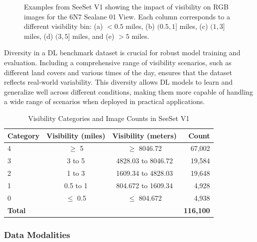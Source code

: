 \begin{figure}
    \caption{Examples from SeeSet V1 showing the impact of visibility on RGB images for the 6N7 Sealane 01 View. Each column corresponds to a different visibility bin: (a) $< 0.5$ miles, (b) $(0.5, 1]$ miles, (c) $(1, 3]$ miles, (d) $(3, 5]$ miles, and (e) $> 5$ miles.}
    \label{fig:impact_vis_deg_features}
\end{figure}

Diversity in a DL benchmark dataset is crucial for robust model training and evaluation. Including a comprehensive range of visibility scenarios, such as different land covers and various times of the day, ensures that the dataset reflects real-world variability. This diversity allows DL models to learn and generalize well across different conditions, making them more capable of handling a wide range of scenarios when deployed in practical applications.

\begin{table}[htbp]
\centering
\caption{Visibility Categories and Image Counts in SeeSet V1}
\label{tab:vis_img_count}
\begin{tabular}{@{}lccr@{}}
\toprule
\textbf{Category} & \textbf{Visibility (miles)} & \textbf{Visibility (meters)} & \textbf{Count} \\
\midrule
4 & $\geq$ 5 & $\geq$ 8046.72 & 67,002 \\
3 & 3 to 5 & 4828.03 to 8046.72 & 19,584 \\
2 & 1 to 3 & 1609.34 to 4828.03 & 19,648 \\
1 & 0.5 to 1 & 804.672 to 1609.34 & 4,928 \\
0 & $\leq$ 0.5 & $\leq$ 804.672 & 4,938 \\
\midrule
\textbf{Total} & & & \textbf{116,100} \\
\bottomrule
\end{tabular}
\end{table}

\subsubsection{Data Modalities}
\label{modalities}

